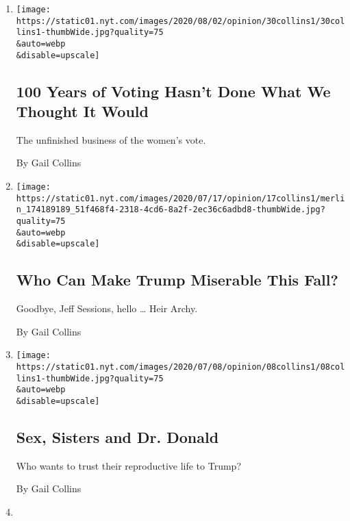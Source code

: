 \begin{enumerate}
\def\labelenumi{\arabic{enumi}.}
\item
  \href{/2020/07/30/opinion/sunday/19th-amendment-women-suffrage.html}{}

  \texttt{[image: https://static01.nyt.com/images/2020/08/02/opinion/30collins1/30collins1-thumbWide.jpg?quality=75\\\&auto=webp\\\&disable=upscale]}

  \hypertarget{100-years-of-voting-hasnt-done-what-we-thought-it-would}{%
  \subsection{100 Years of Voting Hasn't Done What We Thought It
  Would}\label{100-years-of-voting-hasnt-done-what-we-thought-it-would}}

  The unfinished business of the women's vote.

  By Gail Collins
\item
  \href{/2020/07/15/opinion/trump-sessions-senate.html}{}

  \texttt{[image: https://static01.nyt.com/images/2020/07/17/opinion/17collins1/merlin\_174189189\_51f468f4-2318-4cd6-8a2f-2ec36c6adbd8-thumbWide.jpg?quality=75\\\&auto=webp\\\&disable=upscale]}

  \hypertarget{who-can-make-trump-miserable-this-fall}{%
  \subsection{Who Can Make Trump Miserable This
  Fall?}\label{who-can-make-trump-miserable-this-fall}}

  Goodbye, Jeff Sessions, hello \ldots{} Heir Archy.

  By Gail Collins
\item
  \href{/2020/07/08/opinion/birth-control-supreme-court.html}{}

  \texttt{[image: https://static01.nyt.com/images/2020/07/08/opinion/08collins1/08collins1-thumbWide.jpg?quality=75\\\&auto=webp\\\&disable=upscale]}

  \hypertarget{sex-sisters-and-dr-donald}{%
  \subsection{Sex, Sisters and Dr.
  Donald}\label{sex-sisters-and-dr-donald}}

  Who wants to trust their reproductive life to Trump?

  By Gail Collins
\item
  \href{/interactive/2020/07/01/opinion/4th-of-july-quiz.html}{}


\end{enumerate}
